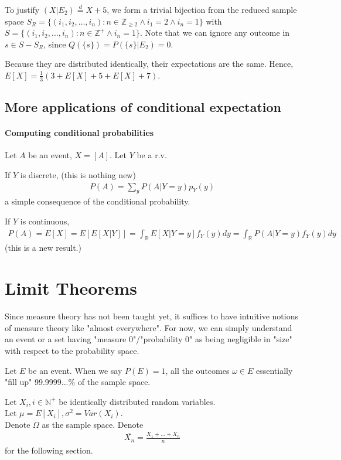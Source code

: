 \documentclass{article}
\newcommand{\eqdis}[0]{\stackrel{d}{=}}
\begin{document}
To justify $(X|E_2)\eqdis X+5$, we form a trivial bijection from the reduced sample space $S_R=\{(i_1,i_2,\dots,i_n): n\in \mathbb{Z}_{\geq 2} \land i_1 = 2 \land i_n = 1\}$ with $S=\{(i_1,i_2,\dots,i_n): n\in \mathbb{Z}^+ \land i_n = 1\}$. Note that we can ignore any outcome in $s\in S-S_R$, since $Q(\{s\})=P(\{s\}|E_2)=0$.

Because they are distributed identically, their expectations are the same. Hence, $E[X] = \frac{1}{3}(3 + E[X] + 5 + E[X] + 7)$.

\subsection{More applications of conditional expectation}
\paragraph{Computing conditional probabilities} Let $A$ be an event, $X = [A]$. Let $Y$ be a r.v.

If $Y$ is discrete, (this is nothing new)
\begin{align*}
	P(A) = \sum_y P(A|Y=y)p_Y(y)
\end{align*}
a simple consequence of the conditional probability.

If $Y$ is continuous,
\begin{align*}
	P(A) = E[X] = E[E[X|Y]] = \int_\mathbb{R} E[X|Y=y]f_Y(y)dy = \int_\mathbb{R} P(A|Y=y)f_Y(y)dy
\end{align*}
(this is a new result.)

\section{Limit Theorems}
Since measure theory has not been taught yet, it suffices to have intuitive notions of measure theory like "almost everywhere". For now, we can simply understand an event or a set having "measure 0"/"probability 0" as being negligible in "size" with respect to the probability space.

Let $E$ be an event. When we say $P(E)=1$, all the outcomes $\omega \in E$ essentially "fill up" 99.9999...\% of the sample space.

Let $X_i, i\in \mathbb{N}^+$ be identically distributed random variables.\\
Let $\mu = E[X_i], \sigma^2 = Var(X_i)$.\\
Denote $\Omega$ as the sample space.
Denote 
\begin{align*}
\overline{X_n} = \frac{X_1+\dots + X_n}{n}
\end{align*}
for the following section.
\end{document}
